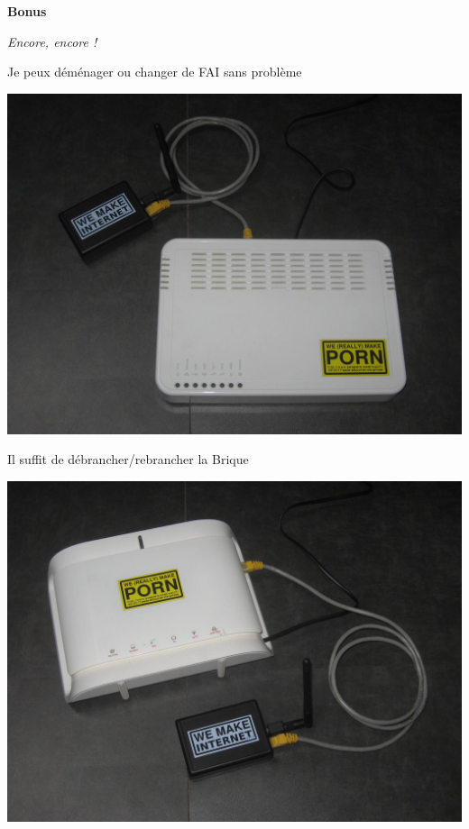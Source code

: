 \documentclass[notes=hide]{beamer}
\begin{document}
\begin{frame}[t]{}
\begin{center}
\vfill
{\Huge \textbf{Bonus}}
\vspace{.5cm}

{\large \emph{Encore, encore !}}
\vfill
\end{center}
\end{frame}



\begin{frame}[t]{Je peux déménager ou changer de FAI sans problème}
\begin{center}
\vfill
\includegraphics[width=.75\textwidth]{img/21-photo-bboxboitier.jpg}
\vfill
\end{center}
\end{frame}

\begin{frame}[t]{Il suffit de débrancher/rebrancher la Brique}
\begin{center}
\vfill
\includegraphics[width=.75\textwidth]{img/22-photo-neufboxboitier.jpg}
\vfill
\end{center}
\end{frame}
\end{document}
